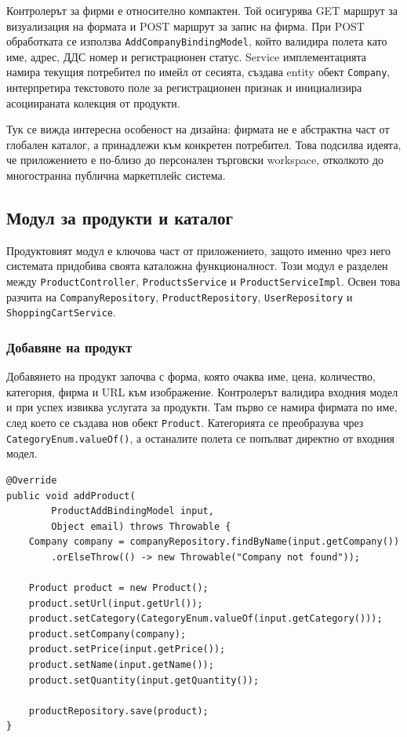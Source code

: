 Контролерът за фирми е относително компактен. Той осигурява GET маршрут за визуализация на формата и POST маршрут за запис на фирма. При POST обработката се използва \texttt{AddCompanyBindingModel}, който валидира полета като име, адрес, ДДС номер и регистрационен статус. Service имплементацията намира текущия потребител по имейл от сесията, създава entity обект \texttt{Company}, интерпретира текстовото поле за регистрационен признак и инициализира асоциираната колекция от продукти.

Тук се вижда интересна особеност на дизайна: фирмата не е абстрактна част от глобален каталог, а принадлежи към конкретен потребител. Това подсилва идеята, че приложението е по-близо до персонален търговски workspace, отколкото до многостранна публична маркетплейс система.

\subsection{Модул за продукти и каталог}

Продуктовият модул е ключова част от приложението, защото именно чрез него системата придобива своята каталожна функционалност. Този модул е разделен между \texttt{ProductController}, \texttt{ProductsService} и \texttt{ProductServiceImpl}. Освен това разчита на \texttt{CompanyRepository}, \texttt{ProductRepository}, \texttt{UserRepository} и \texttt{ShoppingCartService}.

\subsubsection{Добавяне на продукт}

Добавянето на продукт започва с форма, която очаква име, цена, количество, категория, фирма и URL към изображение. Контролерът валидира входния модел и при успех извиква услугата за продукти. Там първо се намира фирмата по име, след което се създава нов обект \texttt{Product}. Категорията се преобразува чрез \texttt{CategoryEnum.valueOf()}, а останалите полета се попълват директно от входния модел.

\begin{lstlisting}[caption={Създаване на нов продукт в service слоя},label={lst:add-product-service}]
@Override
public void addProduct(
        ProductAddBindingModel input,
        Object email) throws Throwable {
    Company company = companyRepository.findByName(input.getCompany())
        .orElseThrow(() -> new Throwable("Company not found"));

    Product product = new Product();
    product.setUrl(input.getUrl());
    product.setCategory(CategoryEnum.valueOf(input.getCategory()));
    product.setCompany(company);
    product.setPrice(input.getPrice());
    product.setName(input.getName());
    product.setQuantity(input.getQuantity());

    productRepository.save(product);
}
\end{lstlisting}

